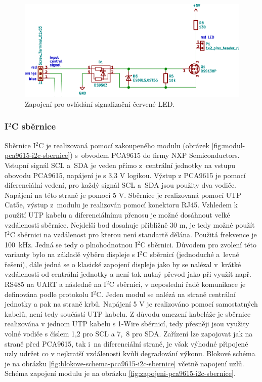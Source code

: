\begin{figure}[H]
    \centering
    \includegraphics[width=\textwidth]{images/svg/kicad/ochrana-krby-lcd-teplotni-senzor.eps}
    \caption{Zapojení pro ovládání signalizační červené LED.}
    \label{fig:ochrana-krby-lcd-teplotni-senzor}
\end{figure}

\subsubsection{I$^2$C sběrnice}
\label{ses:i2c-sbernice}
Sběrnice I$^2$C je realizovaná pomocí zakoupeného modulu (obrázek \ref{fig:modul-pca9615-i2c-sbernice}) s~obvodem PCA9615 do firmy  NXP Semiconductors. Vstupní signál SCL a~SDA je veden přímo z~centrální jednotky na vstupu obovodu PCA9615, napájení je s 3,3 V logikou. Výstup z PCA9615 je pomocí diferenciální vedení, pro každý signál SCL a~SDA jsou použity dva vodiče. Napájení na této straně je pomocí 5 V. Sběrnice je realizovaná pomocí UTP Cat5e, výstup z~modulu je realizován pomocí konektoru RJ45. Vzhledem k použití UTP kabelu a diferenciálnímu přenosu je možné dosáhnout velké vzdálenosti sběrnice. Nejdelší bod dosahuje přibližně 30 m, je tedy možné použít I$^2$C sběrnici na vzdálenost pro kterou není standartě dělána. Použitá frekvence je 100~kHz. Jedná se tedy o plnohodnotnou I$^2$C sběrnici. Důvodem pro zvolení této varianty bylo na základě výběru displeje s I$^2$C sběrnicí (jednoduché a~levné řešení), dále jedná se o klasické zapojení displeje jako by se nalézal v~krátké vzdálenosti od centrální jednotky a není tak nutný převod jako při využít např. RS485 na UART a následně na I$^2$C sběrnici, v neposlední řadě komunikace je definována podle protokolu I$^2$C.  Jeden modul se nalézá na straně centrální jednotky a pak na straně krbů. Napájení 5 V je realizováno pomocí samostatných kabelů, není tedy součástí UTP kabelu. Z důvodu omezení kabeláže je sběrnice realizována v jednom UTP kabelu s 1-Wire sběrnicí, tedy přesněji jsou využity volné vodiče s číslem 1,2 pro SCL a 7,~8 pro SDA. Zařízení lze zapojovat jak na straně před PCA9615, tak i~na diferenciální straně, je však výhodné připojené uzly udržet co v nejkratší vzdálenosti kvůli degradování výkonu. Blokové schéma je na obrázku \ref{fig:blokove-schema-pca9615-i2c-sbernice} včetně napojení uzlů. Schéma zapojení modulu je na obrázku \ref{fig:zapojeni-pca9615-i2c-sbernice}.

